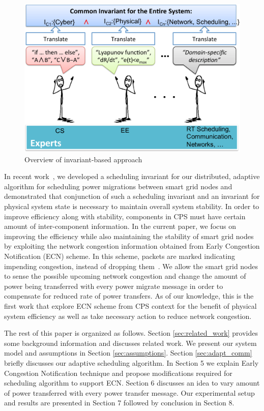 \begin{figure}[htb]
  \begin{center}
     \includegraphics[width=0.9\columnwidth]{Figures/Invariant_Overview.pdf}
  \caption{Overview of invariant-based approach}
  \label{fig:invariant_conjunction}
  \end{center}
\end{figure}

In recent work~\cite{acsmartgrid}, we developed a 
scheduling invariant for our distributed, adaptive algorithm for scheduling power 
migrations between smart grid nodes and demonstrated that conjunction of such a
scheduling invariant and an invariant for physical system state is necessary to 
maintain overall system stability. In order to improve efficiency along with stability, 
components in CPS must have certain amount of inter-component information. 
In the current paper, we focus on improving the efficiency while also maintaining 
the stability of smart grid nodes by exploiting the network congestion information 
obtained from Early Congestion Notification (ECN) scheme. In this scheme, packets 
are marked indicating impending congestion, instead of dropping 
them~\cite{floyd1994tcp, ramakrishnan1999proposal, ramakrishnan2001addition}. 
We allow the smart grid nodes to sense the possible upcoming network congestion and 
change the amount of power being transferred with every power migrate message in order 
to compensate for reduced rate of power transfers. As of our knowledge, this is the 
first work that explore ECN scheme from CPS context for the benefit of physical system 
efficiency as well as take necessary action to reduce network congestion.

The rest of this paper is organized as follows. Section \ref{sec:related_work}
provides some background information and discusses related work. We present our
system model and assumptions in Section \ref{sec:assumptions}. Section
\ref{sec:adapt_comm} briefly discusses our adaptive scheduling algorithm. 
In Section 5 we explain Early Congestion Notification technique and propose modifications
required for scheduling algorithm to support ECN. Section 6 discusses an idea to vary
amount of power transferred with every power transfer message. Our experimental
setup and results are presented in Section 7 followed by conclusion in Section 8. 
